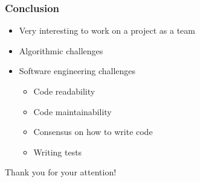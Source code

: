 \documentclass{beamer}
\begin{document}
\begin{frame}
    \frametitle{Conclusion}
    \begin{itemize}
        \item Very interesting to work on a project as a team
        \item Algorithmic challenges
        \item Software engineering challenges
            \begin{itemize}
                \item Code readability
                \item Code maintainability
                \item Consensus on how to write code
                \item Writing tests
            \end{itemize}
    \end{itemize}
\end{frame}

\begin{frame}
\center \huge Thank you for your attention!
\end{frame}
\end{document}
